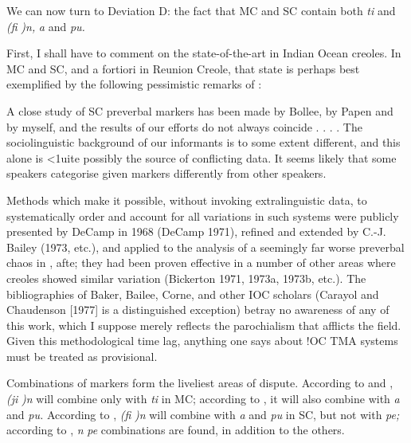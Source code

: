 We can now turn to Deviation D: the fact that MC and SC contain both \textit{ti} and \textit{(}\textit{fi} \textit{)n,} \textit{a} and \textit{pu.}

First, I shall have to comment on the state-of-the-art in Indian Ocean creoles. In MC and SC, and a fortiori in Reunion Creole, that state is perhaps best exemplified by the following pessimistic remarks of \citet[94-95]{Corne1977}:

A close study of SC preverbal markers has been made by Bollee, by Papen and by myself, and the results of our efforts do not always coincide . . . . The sociolinguistic background of our informants is to some extent different, and this alone is {\textless}1uite possibly the source of conflicting data. It seems likely that some speakers categorise given markers differently from other speakers.

Methods which make it possible, without invoking extralinguistic data, to systematically order and account for all variations in such systems were publicly presented by DeCamp in 1968 (DeCamp 1971), refined and extended by C.-J. Bailey (1973, etc.), and applied to the analysis of a seemingly far worse preverbal chaos in \citet{Bickerton1975}, afte; they had been proven effective in a number of other areas where creoles showed similar variation (Bickerton 1971, 1973a, 1973b, etc.). The bibliographies of Baker, Bailee, Corne, and other IOC scholars (Carayol and Chaudenson [1977] is a distinguished exception) betray no awareness of any of this work, which I suppose merely reflects the parochialism that afflicts the field. Given this methodological time lag, anything one says about !OC TMA systems must be treated as provisional.

Combinations of markers form the liveliest areas of dispute. According to \citet{Baker1972} and \citet{Valdman1980}, \textit{(ji} \textit{)n} will combine only with \textit{ti} in MC; according to \citet{Moorghen1975}, it will also combine with \textit{a} and \textit{pu.} According to \citet{Bailee1977}, \textit{(fi} \textit{)n} will combine with \textit{a} and \textit{pu} in SC, but not with \textit{pe;} according to \citet{Corne1977}, \textit{n} \textit{pe} com\-binations are found, in addition to the others.

